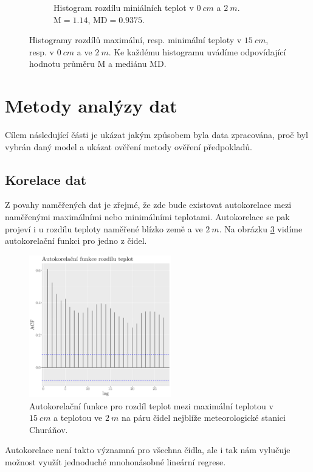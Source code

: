 \begin{figure}
\begin{subfigure}{0.45\textwidth}
		\caption{Histogram rozdílu miniálních teplot v $\SI{0}{cm}$ a $\SI{2}{m}$. $\text{M} = 1.14$, $\text{MD} = 0.9375$.}
		\label{fig:hist_diff_min0cm}
	\end{subfigure}
	\caption{Histogramy rozdílů maximální, resp. minimální teploty v $\SI{15}{cm}$, resp. v $\SI{0}{cm}$ a ve $\SI{2}{m}$. Ke každému histogramu uvádíme odpovídající hodnotu průměru $\text{M}$ a mediánu $\text{MD}$.}
	\label{fig:hist_diff}
\end{figure}


\section{Metody analýzy dat}\label{chap:methods}
Cílem následující části je ukázat jakým způsobem byla data zpracována, proč byl vybrán daný model a ukázat ověření metody ověření předpokladů.

\subsection{Korelace dat}
Z povahy naměřených dat je zřejmé, že zde bude existovat autokorelace mezi naměřenými maximálními nebo minimálními teplotami. Autokorelace se pak projeví i u rozdílu teploty naměřené blízko země a ve $\SI{2}{m}$. Na obrázku \ref{fig:acf} vidíme autokorelační funkci pro jedno z čidel.

\begin{figure}
	\centering
	\includegraphics[width=0.55\textwidth]{img/ch2/acfNPS_4311_D_TMS.png}
	\caption{Autokorelační funkce pro rozdíl teplot mezi maximální teplotou v $\SI{15}{cm}$ a teplotou ve $\SI{2}{m}$ na páru čidel nejblíže meteorologické stanici Churáňov.}
	\label{fig:acf}
\end{figure}

Autokorelace není takto významná pro všechna čidla, ale i tak nám vylučuje možnost využít jednoduché mnohonásobné lineární regrese.

